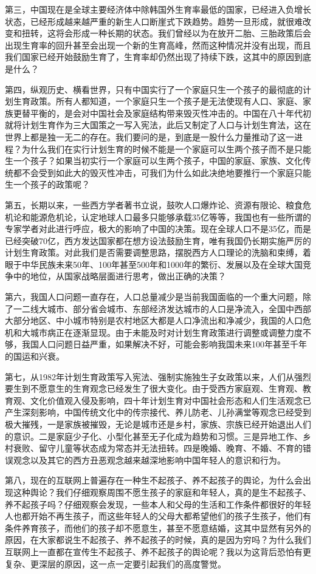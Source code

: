 \documentclass[UTF8,11pt,oneside]{ctexart}
\begin{document}
第三，中国现在是全球主要经济体中除韩国外生育率最低的国家，已经进入负增长状态，已经形成越来越严重的新生人口断崖式下跌趋势。趋势一旦形成，就很难改变和扭转，这将会形成一种长期的状态。我们曾经以为在放开二胎、三胎政策后会出现生育率的回升甚至会出现一个新的生育高峰，然而这种情况并没有出现，而且我们国家已经开始鼓励生育了，生育率却仍然出现了持续下跌，这其中的原因到底是什么？

第四，纵观历史、横看世界，只有中国实行了一个家庭只生一个孩子的最彻底的计划生育政策。所有人都知道，一个家庭只生一个孩子是无法使现有人口、家庭、家族更替平衡的，是会对中国社会及家庭结构带来毁灭性冲击的。中国在八十年代初就将计划生育作为三大国策之一写入宪法，此后又制定了人口与计划生育法，这在世界上都是独一无二的存在。我们要问的是，到底是一股什么力量推动了这一进程？为什么我们在实行计划生育的时候不能是一个家庭可以生两个孩子而不是只能生一个孩子？如果当初实行一个家庭可以生两个孩子，中国的家庭、家族、文化传统都不会受到如此大的毁灭性冲击，可我们为什么如此决绝地要推行一个家庭只能生一个孩子的政策呢？

第五，长期以来，一些西方学者著书立说，鼓吹人口爆炸论、资源有限论、粮食危机论和能源危机论，认定地球人口最多只能够承载35亿等等，我国也有一些所谓的专家学者对此进行呼应，极大的影响了中国的决策。现在全球人口不是35亿，而是已经突破70亿，西方发达国家都在想方设法鼓励生育，唯有我国仍长期实施严厉的计划生育政策。对此我们是否需要调整思路，摆脱西方人口理论的洗脑和束缚，着眼于中华民族未来50年、100年甚至500年和1000年的繁衍、发展以及在全球大国竞争中的地位，从国家战略层面进行思考，做出正确的决策？

第六，我国人口问题一直存在，人口总量减少是当前我国面临的一个重大问题，除了一二线大城市、部分省会城市、东部经济发达城市的人口是净流入，全国中西部大部分地区、中小城市特别是农村地区大都是人口净流出和净减少，我国的人口危机和大城市病正在逐渐显现。由于未能及时对计划生育政策进行调整或调整力度不够，我国人口问题日益严重，如果解决不好，可能会影响我国未来100年甚至千年的国运和兴衰。

第七，从1982年计划生育政策写入宪法、强制实施独生子女政策以来，人们从强烈要生到不愿意生的生育观念已经发生了很大变化。由于受西方家庭观、生育观、教育观、文化价值观入侵及影响，四十年计划生育对中国社会形态和人们生活观念已产生深刻影响，中国传统文化中的传宗接代、养儿防老、儿孙满堂等观念已经受到极大摧残，一是家族被摧毁，无论是城市还是乡村，家族、宗族已经开始退出人们的意识。二是家庭少子化、小型化甚至无子化成为趋势和习惯。三是异地工作、乡村衰败、留守儿童等状态成为常态并无法扭转。四是晚婚、晚育、不婚、不育的错误观念以及其它的西方丑恶观念越来越深地影响中国年轻人的意识和行为。

第八，现在的互联网上普遍存在一种生不起孩子、养不起孩子的舆论，为什么会出现这种舆论？我们仔细观察周围不愿生孩子的家庭和年轻人，真的是生不起孩子、养不起孩子吗？仔细观察会发现，一些本人和父母的生活和工作条件都很好的年轻人也都开始不再生孩子，而这些年轻人的父母大都希望他们的孩子生孩子，他们有条件养育孩子，而他们的孩子却不愿意生，甚至不愿意结婚，这其中显然有另外的原因，在大家都说生不起孩子、养不起孩子的时候，真的是因为穷吗？为什么我们互联网上一直都在宣传生不起孩子、养不起孩子的舆论呢？我以为这背后恐怕有更复杂、更深层的原因，这一点一定要引起我们的高度警觉。
\end{document}
